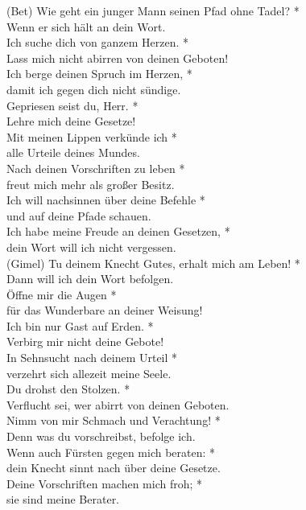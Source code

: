                           (Bet)
Wie geht ein junger Mann seinen Pfad ohne Tadel? *\\
Wenn er sich hält an dein Wort.\\ \vin
 Ich suche dich von ganzem Herzen. *\\ \vin
Lass mich nicht abirren von deinen Geboten!\\
  Ich berge deinen Spruch im Herzen, *\\
damit ich gegen dich nicht sündige.\\ \vin
 Gepriesen seist du, Herr. *\\ \vin
Lehre mich deine Gesetze!\\
 Mit meinen Lippen verkünde ich *\\
alle Urteile deines Mundes.\\ \vin
 Nach deinen Vorschriften zu leben *\\ \vin
freut mich mehr als großer Besitz.\\
 Ich will nachsinnen über deine Befehle *\\
und auf deine Pfade schauen.\\ \vin
 Ich habe meine Freude an deinen Gesetzen, *\\ \vin
dein Wort will ich nicht vergessen.\\ 

                         (Gimel)
 Tu deinem Knecht Gutes, erhalt mich am Leben! *\\
Dann will ich dein Wort befolgen.\\ \vin
 Öffne mir die Augen *\\ \vin
für das Wunderbare an deiner Weisung!\\
 Ich bin nur Gast auf Erden. *\\
Verbirg mir nicht deine Gebote!\\ \vin 
In Sehnsucht nach deinem Urteil *\\ \vin
verzehrt sich allezeit meine Seele.\\
 Du drohst den Stolzen. *\\
Verflucht sei, wer abirrt von deinen Geboten.\\ \vin 
Nimm von mir Schmach und Verachtung! *\\ \vin
Denn was du vorschreibst, befolge ich.\\
Wenn auch Fürsten gegen mich beraten: *\\
dein Knecht sinnt nach über deine Gesetze.\\ \vin
Deine Vorschriften machen mich froh; *\\ \vin
sie sind meine Berater.\\

